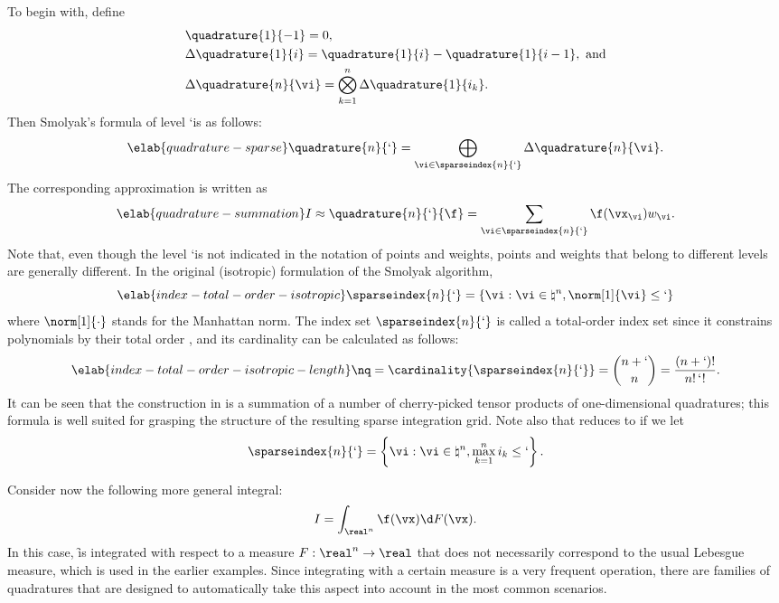 To begin with, define
\begin{align*}
  & \quadrature{1}{-1} = 0, \\
  & \Delta\quadrature{1}{i} = \quadrature{1}{i} - \quadrature{1}{i - 1}, \text{ and} \\
  & \Delta\quadrature{n}{\vi} = \bigotimes_{k = 1}^n \Delta\quadrature{1}{i_k}.
\end{align*}
Then Smolyak's formula of level \lq is as follows:
\begin{equation} \elab{quadrature-sparse}
  \quadrature{n}{\lq} = \bigoplus_{\vi \in \sparseindex{n}{\lq}} \Delta\quadrature{n}{\vi}.
\end{equation}
The corresponding approximation is written as
\begin{equation} \elab{quadrature-summation}
  I \approx \quadrature{n}{\lq}{\f}
  = \sum_{\vi \in \sparseindex{n}{\lq}} \f(\vx_{\vi}) w_{\vi}.
\end{equation}
Note that, even though the level \lq is not indicated in the notation of points
and weights, points and weights that belong to different levels are generally
different. In the original (isotropic) formulation of the Smolyak algorithm,
\begin{equation} \elab{index-total-order-isotropic}
  \sparseindex{n}{\lq} = \left\{ \vi: \vi \in \natural^n, \norm[1]{\vi} \leq \lq \right\}
\end{equation}
where $\norm[1]{\cdot}$ stands for the Manhattan norm. The index set
$\sparseindex{n}{\lq}$ is called a total-order index set since it constrains
polynomials by their total order \cite{eldred2008, beck2011}, and its
cardinality can be calculated as follows:
\begin{equation} \elab{index-total-order-isotropic-length}
  \nq = \cardinality{\sparseindex{n}{\lq}} = {n + \lq \choose n} = \frac{(n + \lq)!}{n! \, \lq!}.
\end{equation}
It can be seen that the construction in  is a summation
of a number of cherry-picked tensor products of one-dimensional quadratures;
this formula is well suited for grasping the structure of the resulting sparse
integration grid. Note also that  reduces to
 if we let
\[
  \sparseindex{n}{\lq} = \left\{ \vi: \vi \in \natural^n, \max_{k = 1}^n i_k \leq \lq \right\}.
\]

Consider now the following more general integral:
\[
  I = \int_{\real^n} \f(\vx) \d F(\vx).
\]
In this case, \f is integrated with respect to a measure $F: \real^n \to \real$
\cite{durrett2010} that does not necessarily correspond to the usual Lebesgue
measure, which is used in the earlier examples. Since integrating with a certain
measure is a very frequent operation, there are families of quadratures that are
designed to automatically take this aspect into account in the most common
scenarios.

